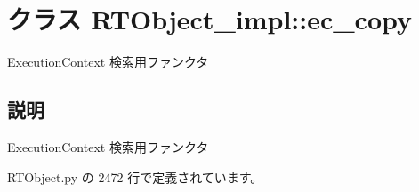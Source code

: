 \section{クラス RTObject\_\-impl::ec\_\-copy}
\label{classsource__py_1_1_r_t_object_1_1_r_t_object__impl_1_1ec__copy}
ExecutionContext 検索用ファンクタ  




\subsection{説明}
ExecutionContext 検索用ファンクタ 

 RTObject.py の 2472 行で定義されています。